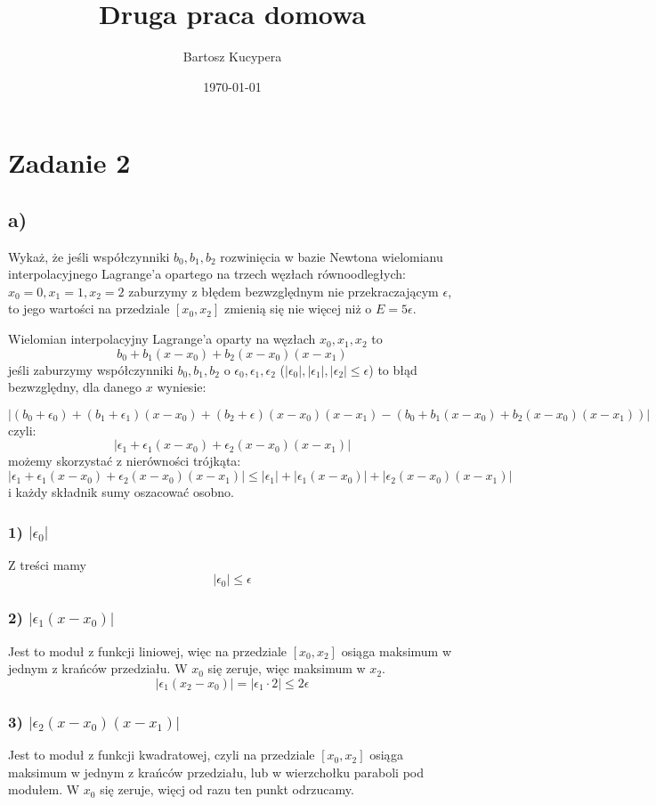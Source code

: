 \documentclass{article}
\title{Druga praca domowa}
\author{Bartosz Kucypera}
\date{\today}
\begin{document}
\maketitle

\section*{Zadanie 2}
\subsection*{a)}
Wykaż, że jeśli współczynniki $b_0, b_1, b_2$ rozwinięcia w bazie Newtona wielomianu interpolacyjnego Lagrange'a opartego na trzech węzłach równoodległych: $x_0=0, x_1 =1,x_2 =2$ zaburzymy z błędem bezwzględnym nie przekraczającym $\epsilon$, to jego wartości na przedziale $[x_0, x_2]$ zmienią się nie więcej niż o $E=5\epsilon$.

Wielomian interpolacyjny Lagrange'a oparty na węzłach $x_0, x_1, x_2$ to
$$b_0 + b_1(x-x_0) + b_2(x-x_0)(x-x_1)$$
jeśli zaburzymy współczynniki $b_0,b_1,b_2$ o $\epsilon_0, \epsilon_1, \epsilon_2$ ($|\epsilon_0|, |\epsilon_1|, |\epsilon_2| \le \epsilon $) to błąd bezwzględny, dla danego $x$ wyniesie:

$$\left|(b_0+\epsilon_0) + (b_1+\epsilon_1)(x-x_0) + (b_2+\epsilon)(x-x_0)(x-x_1) - \left(b_0 + b_1(x-x_0) + b_2(x-x_0)(x-x_1)\right) \right| $$
czyli:
$$\left|\epsilon_1 + \epsilon_1(x-x_0) + \epsilon_2(x-x_0)(x-x_1)\right|$$
możemy skorzystać z nierówności trójkąta:
$$\left|\epsilon_1 + \epsilon_1(x-x_0) + \epsilon_2(x-x_0)(x-x_1)\right| \le |\epsilon_1| + |\epsilon_1(x-x_0)| + |\epsilon_2(x-x_0)(x-x_1)|  $$
i każdy składnik sumy oszacować osobno.
\subsubsection*{1) $|\epsilon_0|$}
Z treści mamy 
$$|\epsilon_0| \le \epsilon$$
\subsubsection*{2) $|\epsilon_1(x-x_0)|$}
Jest to moduł z funkcji liniowej, więc na przedziale $[x_0,x_2]$ osiąga maksimum w jednym z krańców przedziału. W $x_0$ się zeruje, więc maksimum w $x_2$.
$$|\epsilon_1(x_2-x_0)| = |\epsilon_1\cdot2| \le 2\epsilon$$

\subsubsection*{3) $|\epsilon_2(x-x_0)(x-x_1)|$}
Jest to moduł z funkcji kwadratowej, czyli na przedziale $[x_0, x_2]$ osiąga maksimum w jednym z krańców przedziału, lub w wierzchołku paraboli pod modułem. W $x_0$ się zeruje, więcj od razu ten punkt odrzucamy.
\end{document}
